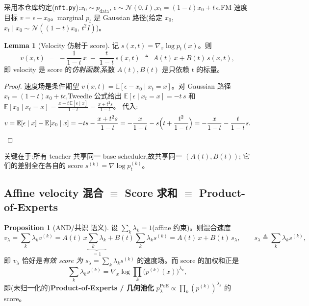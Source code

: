\documentclass[11pt,a4paper]{article}
\newcommand{\E}{\mathbb{E}}
\newcommand{\N}{\mathcal{N}}
\newcommand{\PoE}{\mathrm{PoE}}
\theoremstyle{definition}
\newtheorem{proposition}{Proposition}
\newtheorem{lemma}{Lemma}
\begin{document}
采用本仓库约定(\texttt{nft.py}):$x_0\sim p_{\text{data}}$,
$\epsilon\sim\N(0,I)$,$x_t=(1-t)x_0+t\,\epsilon$,FM 速度目标
$v=\epsilon-x_0$。marginal $p_t$ 是 Gaussian 路径(给定 $x_0$,
$x_t\mid x_0\sim\N((1-t)x_0,\,t^2 I)$)。

\begin{lemma}[Velocity 仿射于 score]
\label{lem:affine}
记 $s(x,t)=\nabla_x\log p_t(x)$。则
\begin{equation}
v(x,t) \;=\; -\frac{1}{1-t}\,x \;-\; \frac{t}{1-t}\,s(x,t)
\;\triangleq\; A(t)\,x + B(t)\,s(x,t),
\label{eq:affine}
\end{equation}
即 velocity 是 score 的\emph{仿射函数},系数 $A(t),B(t)$ 是只依赖 $t$ 的标量。
\end{lemma}

\begin{proof}
速度场是条件期望 $v(x,t)=\E[\epsilon-x_0\mid x_t=x]$。对 Gaussian 路径
$x_t=(1-t)x_0+t\epsilon$,Tweedie 公式给出
$\E[\epsilon\mid x_t=x]=-t\,s$ 和
$\E[x_0\mid x_t=x]=\frac{x-t\,\E[\epsilon\mid x]}{1-t}=\frac{x+t^2 s}{1-t}$。
代入:
\[
v=\E[\epsilon\mid x]-\E[x_0\mid x]
=-t s-\frac{x+t^2 s}{1-t}
=-\frac{x}{1-t}-s\Big(t+\frac{t^2}{1-t}\Big)
=-\frac{x}{1-t}-\frac{t}{1-t}s. \qedhere
\]
\end{proof}

关键在于:所有 teacher 共享同一 base scheduler,故共享同一 $(A(t),B(t))$;
它们的差别全在各自的 score $s^{(k)}=\nabla\log p^{(k)}_t$。

\subsection{Affine velocity 混合 $\equiv$ Score 求和 $\equiv$ Product-of-Experts}
\label{ssec:and}

\begin{proposition}[AND/共识 语义]
\label{prop:poe}
设 $\sum_k\lambda_k=1$(affine 约束)。则混合速度
\begin{equation}
v_\lambda=\sum_k\lambda_k v^{(k)}
= A(t)\,x\underbrace{\textstyle\sum_k\lambda_k}_{=1}+B(t)\sum_k\lambda_k s^{(k)}
= A(t)\,x + B(t)\,s_\lambda,
\qquad s_\lambda\triangleq\sum_k\lambda_k s^{(k)},
\label{eq:score_sum}
\end{equation}
即 $v_\lambda$ 恰好是\emph{有效 score 为 $s_\lambda=\sum_k\lambda_k s^{(k)}$}
的速度场。而 score 的加权和正是
\begin{equation}
\sum_k\lambda_k s^{(k)}=\nabla_x\log\prod_k \big(p^{(k)}(x)\big)^{\lambda_k},
\end{equation}
即(未归一化的)\textbf{Product-of-Experts / 几何池化} $p_\lambda^{\PoE}\propto
\prod_k (p^{(k)})^{\lambda_k}$ 的 score。
\end{proposition}
\end{document}
